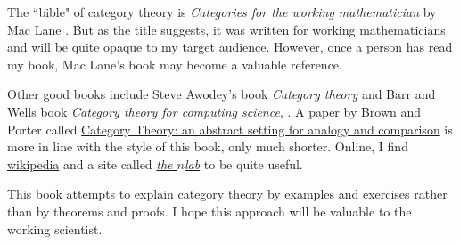 \documentclass{book}
\theoremstyle{remark}
\theoremstyle{definition}
\begin{document}
The ``bible" of category theory is {\em Categories for the working mathematician} by Mac Lane \cite{Mac}. But as the title suggests, it was written for working mathematicians and will be quite opaque to my target audience. However, once a person has read my book, Mac Lane's book may become a valuable reference. 

Other good books include Steve Awodey's book {\em Category theory} \cite{Awo} and Barr and Wells book {\em Category theory for computing science}, \cite{BW}.  A paper by Brown and Porter called  \href{http://pages.bangor.ac.uk/\%7Emas010/pdffiles/Analogy-and-Comparison.pdf}{\text Category Theory: an abstract setting for analogy and comparison} \cite{BP1} is more in line with the style of this book, only much shorter. Online, I find \href{http://www.wikipedia.org}{\text wikipedia} and a site called \href{http://ncatlab.org/nlab/show/HomePage}{\em the $n$lab} to be quite useful. 

This book attempts to explain category theory by examples and exercises rather than by theorems and proofs. I hope this approach will be valuable to the working scientist.

\end{document}
